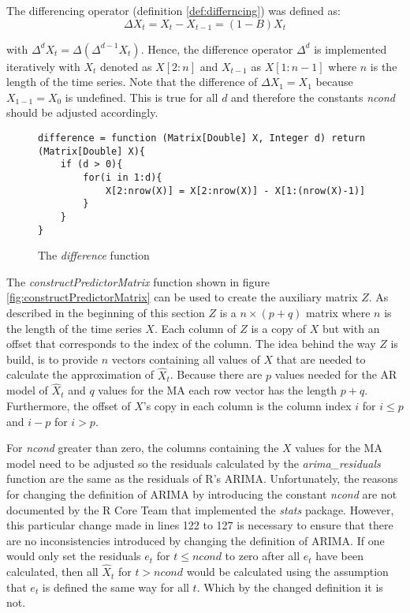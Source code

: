 The differencing operator (definition \ref{def:differncing}) was defined as:
\begin{equation*}
    \Delta X_t = X_t - X_{t-1} = (1-B)X_t
\end{equation*}

with $\Delta^d X_t = \Delta (\Delta^{d-1} X_t )$. Hence, the difference operator $\Delta^d$ is implemented iteratively with $X_t$ denoted as $X[2:n]$ and $X_{t-1}$ as $X[1:n-1]$ where $n$ is the length of the time series. Note that the difference of $\Delta X_1 = X_1$ because $X_{1-1} = X_{0}$ is undefined. This is true for all $d$ and therefore the constants \textit{ncond} should be adjusted accordingly.

\begin{figure}[!ht]
\centering
\begin{verbatim}
difference = function (Matrix[Double] X, Integer d) return (Matrix[Double] X){
    if (d > 0){
        for(i in 1:d){
            X[2:nrow(X)] = X[2:nrow(X)] - X[1:(nrow(X)-1)]
        }
    }
}
\end{verbatim}
\vspace*{-0.3cm}
\caption{The \textit{difference} function}
\label{fig:difference}
\end{figure}

The \textit{constructPredictorMatrix} function shown in figure \ref{fig:constructPredictorMatrix} can be used to create the auxiliary matrix $Z$. As described in the beginning of this section $Z$ is a $n \times (p+q)$ matrix where $n$ is the length of the time series $X$. Each column of $Z$ is a copy of $X$ but with an offset that corresponds to the index of the column. The idea behind the way $Z$ is build, is to provide $n$ vectors containing all values of $X$ that are needed to calculate the approximation of $\hat{X}_t$. Because there are $p$ values needed for the \acl{AR} model of $\hat{X}_t$ and $q$ values for the \acl{MA} each row vector has the length $p+q$. Furthermore, the offset of $X$'s copy in each column is the column index $i$ for $i \leq p$ and $i-p$ for $i > p$.

For \textit{ncond} greater than zero, the columns containing the $X$ values for the \acl{MA} model need to be adjusted so the residuals calculated by the \textit{arima\_residuals} function are the same as the residuals of R's \acs{ARIMA}. Unfortunately, the reasons for changing the definition of \acs{ARIMA} by introducing the constant \textit{ncond} are not documented by the R Core Team that implemented the \textit{stats} package. However, this particular change made in lines 122 to 127 is necessary to ensure that there are no inconsistencies introduced by changing the definition of \acs{ARIMA}. If one would only set the residuals $e_t$ for $t \leq ncond$ to zero after all $e_t$ have been calculated, then all $\hat{X}_t$ for $t > ncond$ would be calculated using the assumption that $e_t$ is defined the same way for all $t$. Which by the changed definition it is not.

